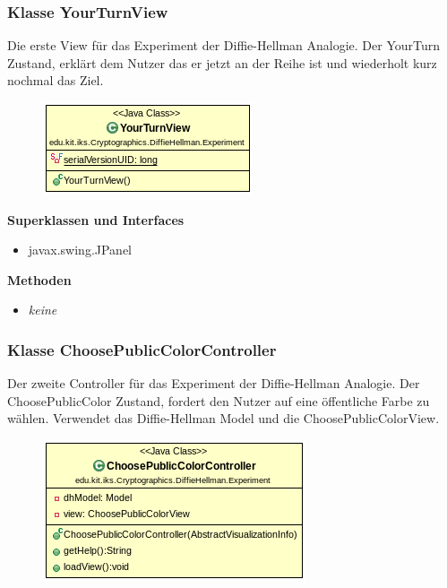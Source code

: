 \documentclass{article}
\begin{document}
\subsubsection{Klasse YourTurnView}
      Die erste View für das Experiment der Diffie-Hellman Analogie.
      Der YourTurn Zustand, erklärt dem Nutzer das er jetzt an der Reihe ist
      und wiederholt kurz nochmal das Ziel.

      \begin{figure}[H]
        \centering
        \includegraphics{resources/edu-kit-iks-Cryptographics-DiffieHellman-Experiment-YourTurnView}
      \end{figure}

      \textbf{Superklassen und Interfaces}
      \begin{itemize}
        \item javax.swing.JPanel
      \end{itemize}

      \textbf{Methoden}
      \begin{itemize}
        \item \textit{keine}
      \end{itemize}

\subsubsection{Klasse ChoosePublicColorController}
      Der zweite Controller für das Experiment der Diffie-Hellman Analogie.
      Der ChoosePublicColor Zustand, fordert den Nutzer auf
      eine öffentliche Farbe zu wählen.
      Verwendet das Diffie-Hellman Model und die ChoosePublicColorView.

      \begin{figure}[H]
        \centering
        \includegraphics{resources/edu-kit-iks-Cryptographics-DiffieHellman-Experiment-ChoosePublicColorController}
      \end{figure}
\end{document}
